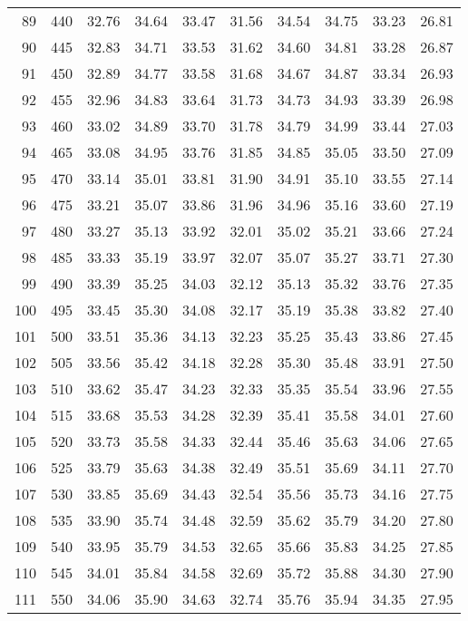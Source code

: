 \begin{longtable}{rrllllllll}
89 & 440 & 32.76 & 34.64 & 33.47 & 31.56 & 34.54 & 34.75 & 33.23 & 26.81 \\ 
90 & 445 & 32.83 & 34.71 & 33.53 & 31.62 & 34.60 & 34.81 & 33.28 & 26.87 \\ 
91 & 450 & 32.89 & 34.77 & 33.58 & 31.68 & 34.67 & 34.87 & 33.34 & 26.93 \\ 
92 & 455 & 32.96 & 34.83 & 33.64 & 31.73 & 34.73 & 34.93 & 33.39 & 26.98 \\ 
93 & 460 & 33.02 & 34.89 & 33.70 & 31.78 & 34.79 & 34.99 & 33.44 & 27.03 \\ 
94 & 465 & 33.08 & 34.95 & 33.76 & 31.85 & 34.85 & 35.05 & 33.50 & 27.09 \\ 
95 & 470 & 33.14 & 35.01 & 33.81 & 31.90 & 34.91 & 35.10 & 33.55 & 27.14 \\ 
96 & 475 & 33.21 & 35.07 & 33.86 & 31.96 & 34.96 & 35.16 & 33.60 & 27.19 \\ 
97 & 480 & 33.27 & 35.13 & 33.92 & 32.01 & 35.02 & 35.21 & 33.66 & 27.24 \\ 
98 & 485 & 33.33 & 35.19 & 33.97 & 32.07 & 35.07 & 35.27 & 33.71 & 27.30 \\ 
99 & 490 & 33.39 & 35.25 & 34.03 & 32.12 & 35.13 & 35.32 & 33.76 & 27.35 \\ 
100 & 495 & 33.45 & 35.30 & 34.08 & 32.17 & 35.19 & 35.38 & 33.82 & 27.40 \\ 
101 & 500 & 33.51 & 35.36 & 34.13 & 32.23 & 35.25 & 35.43 & 33.86 & 27.45 \\ 
102 & 505 & 33.56 & 35.42 & 34.18 & 32.28 & 35.30 & 35.48 & 33.91 & 27.50 \\ 
103 & 510 & 33.62 & 35.47 & 34.23 & 32.33 & 35.35 & 35.54 & 33.96 & 27.55 \\ 
104 & 515 & 33.68 & 35.53 & 34.28 & 32.39 & 35.41 & 35.58 & 34.01 & 27.60 \\ 
105 & 520 & 33.73 & 35.58 & 34.33 & 32.44 & 35.46 & 35.63 & 34.06 & 27.65 \\ 
106 & 525 & 33.79 & 35.63 & 34.38 & 32.49 & 35.51 & 35.69 & 34.11 & 27.70 \\ 
107 & 530 & 33.85 & 35.69 & 34.43 & 32.54 & 35.56 & 35.73 & 34.16 & 27.75 \\ 
108 & 535 & 33.90 & 35.74 & 34.48 & 32.59 & 35.62 & 35.79 & 34.20 & 27.80 \\ 
109 & 540 & 33.95 & 35.79 & 34.53 & 32.65 & 35.66 & 35.83 & 34.25 & 27.85 \\ 
110 & 545 & 34.01 & 35.84 & 34.58 & 32.69 & 35.72 & 35.88 & 34.30 & 27.90 \\ 
111 & 550 & 34.06 & 35.90 & 34.63 & 32.74 & 35.76 & 35.94 & 34.35 & 27.95 \\ 

\end{longtable}
